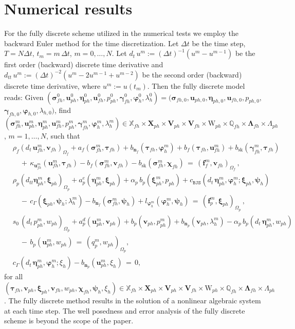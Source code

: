 \documentclass[11pt]{article}
\numberwithin{equation}{section}
\newcommand{\ds}{\displaystyle}
\newcommand{\bgamma}{{\boldsymbol\gamma}}
\newcommand{\bLambda}{{\boldsymbol\Lambda}}
\newcommand{\bbeta}{{\boldsymbol\eta}}
\newcommand{\bsi}{{\boldsymbol\sigma}}
\newcommand{\bvarphi}{{\boldsymbol\varphi}}
\newcommand{\bpsi}{{\boldsymbol\psi}}
\newcommand{\btau}{{\boldsymbol\tau}}
\newcommand{\bchi}{{\boldsymbol\chi}}
\newcommand{\bxi}{{\boldsymbol\xi}}
\newcommand{\bv}{{\mathbf{v}}}
\newcommand{\f}{\mathbf{f}}
\newcommand{\bu}{\mathbf{u}}
\newcommand{\bn}{{\mathbf{n}}}
\newcommand{\0}{{\mathbf{0}}}
\def\bX{\mathbf{X}}
\def\bV{\mathbf{V}}
\newcommand\bbQ{\mathbb{Q}}
\newcommand\bbX{\mathbb{X}}
\def\W{\mathrm{W}}
\def\BJS{\mathtt{BJS}}
\def\sk{\mathrm{sk}}
\numberwithin{equation}{section}
\begin{document}
\section{Numerical results}\label{sec:numerical}

For the fully discrete scheme utilized in the numerical tests we employ the backward Euler method for the time discretization. 
Let $\Delta t$ be the time step, $T=N \Delta t$, $t_m = m\,\Delta t$, $m=0,\dots, N$. 
Let $d_t\, u^m := (\Delta t)^{-1}(u^m - u^{m-1})$ be the first order (backward) discrete 
time derivative and  $d_{tt} \, u^m := (\Delta t)^{-2}(u^m - 2u^{m-1} + u^{m-2})$ be the second order (backward) discrete 
time derivative, where $u^m := u(t_m)$. Then the fully discrete model reads: 
Given $(\bsi_{fh}^0,\bu_{ph}^0, \bbeta_{ph}^0, \bu_{fh}^0, p_{ph}^0, \bgamma_{fh}^0, \bvarphi_{h}^0, \lambda_{h}^0)=(\bsi_{fh,0},\bu_{ph,0}, \bbeta_{ph,0}, \bu_{fh,0}, p_{ph,0},$
$ \bgamma_{fh,0}, \bvarphi_{h,0}, \lambda_{h,0})$, find $(\bsi_{fh}^m,\bu_{ph}^m, \bbeta_{ph}^m, \bu_{fh}^m, p_{ph}^m, \bgamma_{fh}^m, \bvarphi_{h}^m, \lambda_{h}^m)\in\bbX_{fh}\times \bX_{ph}\times \bV_{ph}\times \bV_{fh}\times \W_{ph}\times \bbQ_{fh}\times \bLambda_{fh}\times \Lambda_{ph}$, $m=1, \dots, N$, such that 
\begin{align}
& \rho_f (d_t\,\bu_{fh}^m,\bv_{fh})_{\Omega_f}
+ a_f(\bsi_{fh}^m,\btau_{fh})
+ b_{\bn_f}(\btau_{fh},\bvarphi_{h}^m) 
+ b_f(\btau_{fh},\bu_{fh}^m) 
+ b_\sk(\bgamma_{fh}^m,\btau_{fh})
\nonumber\\ 
&\ds\quad +\, \kappa_{\bu_{fh}^m}(\bu_{fh}^m, \btau_{fh}) 
- b_f(\bsi_{fh}^m,\bv_{fh}) 
- b_\sk(\bsi_{fh}^m,\bchi_{fh})  
\,=\, (\f_{f}^m,\bv_{fh})_{\Omega_f}\,,  
\nonumber\\ 
& \rho_p(d_{tt}\bbeta_{ph}^m,\bxi_{ph})_{\Omega_p} 
+ a^e_p(\bbeta_{ph}^m,\bxi_{ph})
+ \alpha_p\,b_p(\bxi_{ph}^m,p_{ph}) 
+ c_{\BJS}(d_t\,\bbeta_{ph}^m, \bvarphi_{h}^m;\bxi_{ph}, \bpsi_{h}) 
\nonumber\\ 
&\ds\quad -\, c_{\Gamma}(\bxi_{ph},\bpsi_{h};\lambda_{h}^m) 
- b_{\bn_f}(\bsi_{fh}^m,\bpsi_{h})
+ l_{\bvarphi_{h}^m}(\bvarphi_{h}^m,\bpsi_{h}) 
\,=\, (\f_{p}^m,\bxi_{ph})_{\Omega_p}\,, 
\nonumber\\ 
& s_0\,(d_t\,p_{ph}^m,w_{ph})_{\Omega_p} 
+ a^d_p(\bu_{ph}^m,\bv_{ph}) 
+ b_p(\bv_{ph},p_{ph}^m)
+ b_{\bn_p}(\bv_{ph},\lambda_{h}^m) 
- \alpha_p\,b_p(d_t\,\bbeta_{ph}^m,w_{ph})
\nonumber\\ 
&\ds\quad -\, b_p(\bu_{ph}^m,w_{ph}) 
\,=\, (q_{p}^m,w_{ph})_{\Omega_p},  
\nonumber\\ 
& c_{\Gamma}(d_t\,\bbeta_{ph}^m,\bvarphi_{h}^m;\xi_{h})
- b_{\bn_p}(\bu_{ph}^m,\xi_{h})
\,=\,0,  
\label{eq: discrete formulation}
\end{align}
for all $(\btau_{fh}, \bv_{ph}, \bxi_{ph}, \bv_{fh}, w_{ph}, \bchi_{fh}, \bpsi_{h}, \xi_{h})\in \bbX_{fh}\times \bX_{ph}\times \bV_{ph}\times \bV_{fh}\times \W_{ph}\times \bbQ_{fh}\times \bLambda_{fh}\times \Lambda_{ph}$.
The fully discrete method results in the solution of a nonlinear algebraic system at each time step. The well posedness and error analysis of the fully discrete scheme is beyond the scope of the paper.
\end{document}
